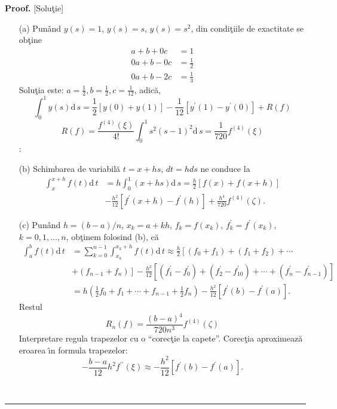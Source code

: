 \documentclass{article}%
\newenvironment{proof}[1][Proof]{\noindent\textbf{#1.} }{\ \rule{0.5em}{0.5em}}
\begin{document}
\begin{proof}
[Solu\c{t}ie]

\begin{enumerate}
\item[(a)] Pun\^{a}nd $y(s)=1$, $y(s)=s$, $y(s)=s^{2}$, din condi\c{t}iile de
exactitate se ob\c{t}ine%
\begin{align*}
a+b+0c &  =1\\
0a+b-0c &  =\frac{1}{2}\\
0a+b-2c &  =\frac{1}{3}%
\end{align*}
Solu\c{t}ia este: $a=\frac{1}{2},b=\frac{1}{2},c=\frac{1}{12}$, adic\u{a},%
\[
\int_{0}^{1}y(s)\mathrm{d}\,s=\frac{1}{2}\left[  y(0)+y(1)\right]  -\frac
{1}{12}\left[  y^{\prime}(1)-y^{\prime}(0)\right]  +R(f)
\]%
\[
R(f)=\frac{f^{(4)}(\xi)}{4!}\int_{0}^{1}s^{2}(s-1)^{2}\mathrm{d}\,s=\frac
{1}{720}f^{(4)}(\xi)
\]
: 

\item[(b)] Schimbarea de variabil\u{a} $t=x+hs$, $dt=hds$ ne conduce la%
\begin{align*}
\int_{x}^{x+h}f(t)\mathrm{d}\,t &  =h\int_{0}^{1}\left(  x+hs\right)
\mathrm{d}\,s=\frac{h}{2}\left[  f(x)+f(x+h)\right]  \\
&  -\frac{h^{2}}{12}\left[  f^{\prime}(x+h)-f^{\prime}(h)\right]  +\frac
{h^{4}}{720}f^{(4)}\left(  \zeta\right)  .
\end{align*}


\item[(c)] Pun\^{a}nd $h=(b-a)/n$, $x_{k}=a+kh$, $f_{k}=f(x_{k})$,
$f_{k}^{\prime}=f^{\prime}(x_{k})$, $k=0,1,\dots,n$, ob\c{t}inem folosind (b),
c\u{a}%
\begin{align*}
\int_{a}^{b}f(t)\mathrm{d}\,t &  =\sum_{k=0}^{n-1}\int_{x_{k}}^{x_{k}%
+h}f(t)\mathrm{d}\,t\approx\frac{h}{2}\left[  \left(  f_{0}+f_{1}\right)
+\left(  f_{1}+f_{2}\right)  +\cdots\right.  \\
&  +\left.  \left(  f_{n-1}+f_{n}\right)  \right]  -\frac{h^{2}}{12}\left[
\left(  f_{1}^{\prime}-f_{0}^{\prime}\right)  +\left(  f_{2}^{\prime}%
-f_{10}^{\prime}\right)  +\cdots+\left(  f_{n}^{\prime}-f_{n-1}^{\prime
}\right)  \right]  \\
&  =h\left(  \frac{1}{2}f_{0}+f_{1}+\cdots+f_{n-1}+\frac{1}{2}f_{n}\right)
-\frac{h^{2}}{12}\left[  f^{\prime}(b)-f^{\prime}(a)\right]  .
\end{align*}
Restul%
\[
R_{n}(f)=\frac{(b-a)^{4}}{720n^{3}}f^{(4)}(\zeta)
\]
Interpretare regula trapezelor cu o  \textquotedblleft corec\c{t}ie la
capete\textquotedblright. Corec\c{t}ia aproximeaz\u{a} eroarea \^{\i}n formula
trapezelor:%
\[
-\frac{b-a}{12}h^{2}f^{\prime\prime}(\xi)\approx-\frac{h^{2}}{12}\left[
f^{\prime}(b)-f^{\prime}(a)\right]  .
\]

\end{enumerate}
\end{proof}
\end{document}
